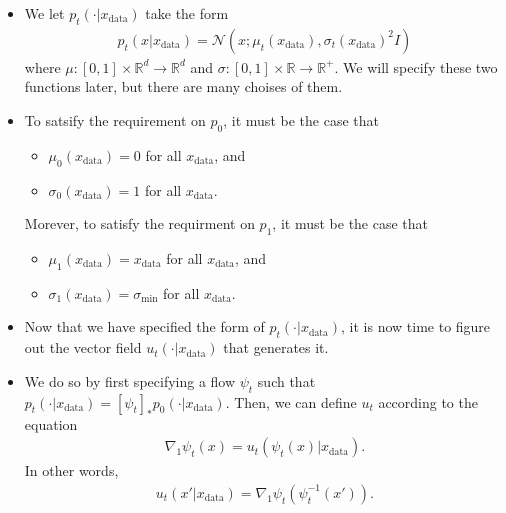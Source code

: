 \documentclass[10pt]{article}
\newcommand{\ra}{\rightarrow}
\newcommand{\mcal}[1]{\mathcal{#1}}
\newcommand{\Real}{\mathbb{R}}
\newcommand{\data}{\mathrm{data}}
\begin{document}
\begin{itemize}
  \item We let $p_t(\cdot|x_{\data})$ take the form
  \begin{align}
    p_t(x|x_{\data}) = \mcal{N}(x;\mu_t(x_{\data}), \sigma_t(x_{\data})^2 I) \label{eqn:mu-sigma}
  \end{align}
  where $\mu: [0,1] \times \Real^d \ra \Real^d$ and $\sigma: [0,1] \times \Real \ra \Real^{+}.$ We will specify these two functions later, but there are many choises of them.

  \item To satsify the requirement on $p_0$, it must be the case that
  \begin{itemize}
    \item $\mu_0(x_{\data}) = 0$ for all $x_{\data}$, and
    \item $\sigma_0(x_{\data}) = 1$ for all $x_{\data}$.
  \end{itemize}
  Morever, to satisfy the requirment on $p_1$, it must be the case that
  \begin{itemize}
    \item $\mu_1(x_{\data}) = x_{\data}$ for all $x_{\data}$, and
    \item $\sigma_1(x_{\data}) = \sigma_{\min}$ for all $x_{\data}$.
  \end{itemize}

  \item Now that we have specified the form of $p_t(\cdot|x_{\data})$, it is now time to figure out the vector field $u_t(\cdot|x_{\data})$ that generates it. 
  
  \item We do so by first specifying a flow $\psi_t$ such that $p_t(\cdot|x_{\data}) = [\psi_t]_* p_0(\cdot|x_{\data})$. Then, we can define $u_t$ according to the equation
  \begin{align*}
    \nabla_1 \psi_t(x) = u_t(\psi_t(x)| x_{\data}).
  \end{align*}
  In other words,
  \begin{align}
    u_t(x'| x_{\data}) = \nabla_1 \psi_t(\psi_t^{-1}(x')). \label{eqn:single-item-vector-field}
  \end{align}


\end{itemize}
\end{document}
